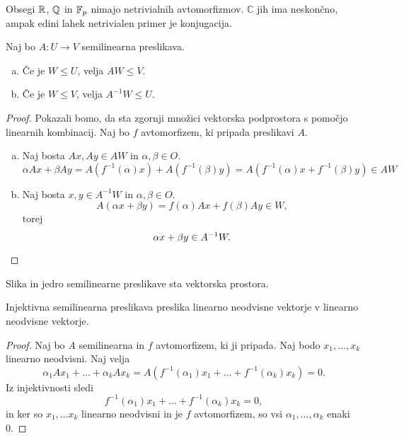 \begin{opomba}
    Obsegi $\mathbb{R}$, $\mathbb{Q}$ in $\mathbb{F}_p$ nimajo netrivialnih avtomorfizmov. $\mathbb{C}$ jih ima neskončno, ampak edini lahek netrivialen primer je konjugacija.
\end{opomba}

\begin{trditev}
    Naj bo $A \colon U \to V$ semilinearna preslikava.
    
    \begin{enumerate}[a)]
        \item Če je $W \leq U$, velja $AW \leq V$.
        \item Če je $W \leq V$, velja $A^{-1} W \leq U$.
    \end{enumerate}
\end{trditev}

\begin{proof}
    Pokazali bomo, da sta zgornji množici vektorska podprostora s pomočjo linearnih kombinacij. Naj bo $f$ avtomorfizem, ki pripada preslikavi $A$.
    \begin{enumerate}[a)]
        \item Naj bosta $Ax,Ay \in AW$ in $\alpha, \beta \in O$.
        \[
            \alpha Ax + \beta Ay = A(f^{-1}(\alpha) x) + A(f^{-1}(\beta) y) = A(f^{-1}(\alpha) x + f^{-1}(\beta) y) \in AW
        \]
        
        \item Naj bosta $x,y \in A^{-1}W$ in $\alpha, \beta \in O$.
        \[
            A(\alpha x + \beta y) = f(\alpha)Ax + f(\beta)Ay \in W,
        \]
        torej
        \[
        \alpha x + \beta y \in A^{-1}W.   \qedhere
        \]
    \end{enumerate}
\end{proof}

\begin{posledica}
    Slika in jedro semilinearne preslikave sta vektorska prostora.
\end{posledica}

\begin{trditev}
    Injektivna semilinearna preslikava preslika linearno neodvisne vektorje v linearno neodvisne vektorje.
\end{trditev}

\begin{proof}
    Naj bo $A$ semilinearna in $f$ avtomorfizem, ki ji pripada. Naj bodo $x_1, \dots, x_k$ linearno neodvisni. Naj velja
    \[
        \alpha_1 A x_1 + \dots + \alpha_k A x_k = A (f^{-1}(\alpha_1) x_1 + \dots + f^{-1}(\alpha_k) x_k) = 0.
    \]
    Iz injektivnosti sledi
    \[
        f^{-1}(\alpha_1) x_1 + \dots + f^{-1}(\alpha_k) x_k = 0,
    \]
    in ker so $x_1, \dots x_k$ linearno neodvisni in je $f$ avtomorfizem, so vsi $\alpha_1, \dots, \alpha_k$ enaki 0.
\end{proof}

